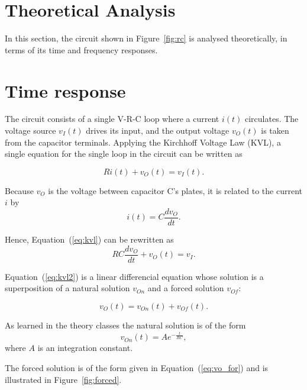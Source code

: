 \section{Theoretical Analysis}
\label{sec:analysis}

In this section, the circuit shown in Figure~\ref{fig:rc} is analysed
theoretically, in terms of its time and frequency responses.

\section{Time response}

The circuit consists of a single V-R-C loop where a current $i(t)$ circulates. The
voltage source $v_I(t)$ drives its input, and the output voltage $v_O(t)$ is taken from
the capacitor terminals. Applying the Kirchhoff Voltage Law (KVL), a single
equation for the single loop in the circuit can be written as

\begin{equation}
  Ri(t) + v_O(t) = v_I(t).
  \label{eq:kvl}
\end{equation}

Because $v_O$ is the voltage between capacitor C's plates, it is related to the
current $i$ by
\begin{equation}
  i(t) = C\frac{dv_O}{dt}.
\end{equation}

Hence, Equation~(\ref{eq:kvl}) can be rewritten as
\begin{equation}
  RC\frac{dv_O}{dt} + v_O(t) = v_I.
  \label{eq:kvl2}
\end{equation}

Equation~(\ref{eq:kvl2}) is a linear differencial equation whose solution is a
superposition of a natural solution $v_{On}$ and a forced solution $v_{Of}$:

\begin{equation}
  v_O(t) = v_{On}(t) + v_{Of}(t).
  \label{eq:vo_sol}
\end{equation}

As learned in the theory classes the natural solution is of the form
\begin{equation}
  v_{On}(t) = Ae^{-\frac{t}{RC}},
  \label{eq:vo_nat}
\end{equation}
where $A$ is an integration constant.

The forced solution is of the form given in Equation~(\ref{eq:vo_for}) and is
illustrated in Figure~\ref{fig:forced}.

